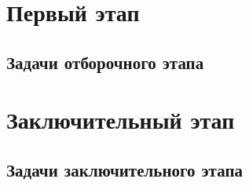 \documentclass[a4paper,12pt,oneside]{book}
\begin{document}

\setcounter{tocdepth}{1}

\setcounter{page}{3}

\tableofcontents



\part{Первый этап}

\chapter{Задачи отборочного этапа}


\part{Заключительный этап}

\chapter{Задачи заключительного этапа}



\clearpage
\text{ }
\end{document}
